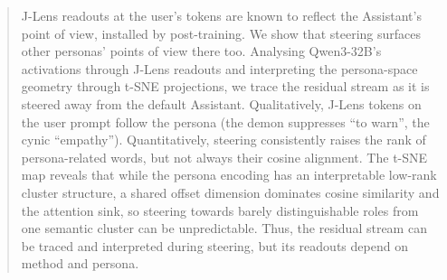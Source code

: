 \begin{abstract}
    J-Lens readouts at the user's tokens are known to reflect the Assistant's point of view, installed by post-training.
    We show that steering surfaces other personas' points of view there too.
    Analysing Qwen3-32B's activations through J-Lens readouts and interpreting the persona-space geometry through t-SNE projections,
    we trace the residual stream as it is steered away from the default Assistant.
    Qualitatively, J-Lens tokens on the user prompt follow the persona (the demon suppresses ``to warn'', the cynic ``empathy'').
    Quantitatively, steering consistently raises the rank of persona-related words, but not always their cosine alignment.
    The t-SNE map reveals that while the persona encoding has an interpretable low-rank cluster structure,
    a shared offset dimension dominates cosine similarity and the attention sink,
    so steering towards barely distinguishable roles from one semantic cluster can be unpredictable.
    Thus, the residual stream can be traced and interpreted during steering, but its readouts depend on method and persona.
\end{abstract}
